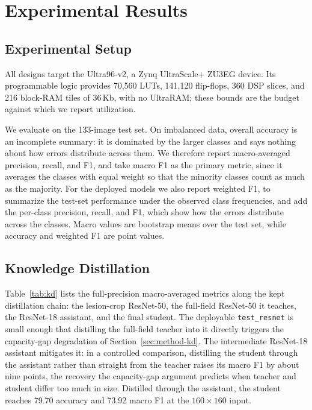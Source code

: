 \section{Experimental Results}
\label{sec:results}

\subsection{Experimental Setup}
\label{sec:res-setup}

All designs target the Ultra96-v2, a Zynq UltraScale+ ZU3EG device. Its
programmable logic provides 70{,}560 LUTs, 141{,}120 flip-flops, 360 DSP slices,
and 216 block-RAM tiles of 36\,Kb, with no UltraRAM; these bounds are the budget
against which we report utilization.

We evaluate on the 133-image test set. On imbalanced data, overall accuracy is an
incomplete summary: it is dominated by the larger classes and says nothing about
how errors distribute across them. We therefore report macro-averaged precision,
recall, and F1, and take macro F1 as the primary metric, since it averages the
classes with equal weight so that the minority classes count as much as the
majority. For the deployed models we also report weighted F1, to summarize the
test-set performance under the observed class frequencies, and add the per-class
precision, recall, and F1, which show how the errors distribute across the
classes. Macro values are bootstrap means over the test set, while accuracy and
weighted F1 are point values. 

\subsection{Knowledge Distillation}
\label{sec:res-kd}

Table~\ref{tab:kd} lists the full-precision macro-averaged metrics along the kept distillation
chain: the lesion-crop ResNet-50, the full-field ResNet-50 it teaches, the
ResNet-18 assistant, and the final student. The deployable \texttt{test\_resnet}
is small enough that distilling the full-field teacher into it directly triggers
the capacity-gap degradation of Section~\ref{sec:method-kd}. The intermediate
ResNet-18 assistant mitigates it: in a controlled comparison, distilling the
student through the assistant rather than straight from the teacher raises its
macro F1 by about nine points, the recovery the capacity-gap argument predicts
when teacher and student differ too much in size. Distilled through the assistant,
the student reaches 79.70 accuracy and 73.92 macro F1 at the $160\times160$
input.


